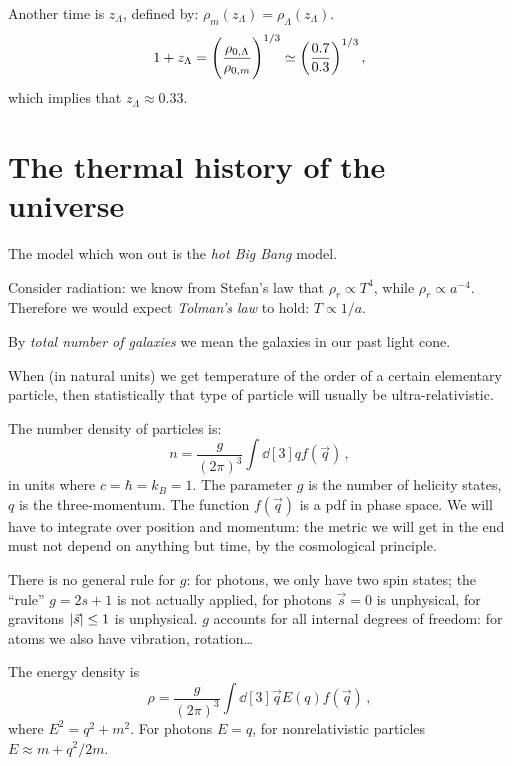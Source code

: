 \documentclass[main.tex]{subfiles}
\begin{document}
Another time is \(z_\Lambda \), defined by: \(\rho _m (z_{\Lambda }) = \rho _\Lambda (z_\Lambda )\). 
%
\begin{equation}
  1+ z_\Lambda = \qty(\frac{\rho_{0, \Lambda }}{\rho_{0,m}})^{1/3} \simeq \qty(\frac{0.7}{0.3})^{1/3}
\,,
\end{equation}
%
which implies that \(z_\Lambda \approx \num{0.33}\).

\chapter{The thermal history of the universe}

The model which won out is the \emph{hot Big Bang} model.

Consider radiation: we know from Stefan's law that \(\rho _r \propto T^{4}\), while \(\rho _r \propto a^{-4}\). Therefore we would expect \emph{Tolman's law} to hold: \(T \propto 1/a\).

By \emph{total number of galaxies} we mean the galaxies in our past light cone.

When (in natural units) we get temperature of the order of a certain elementary particle, then statistically that type of particle will usually be ultra-relativistic.

The number density of particles is: 
%
\begin{equation}
  n = \frac{g}{(2 \pi )^3} \int \dd[3]{q} f(\vec{q})
\,,
\end{equation}
%
in units where \(c= \hbar = k_B = 1\). The parameter \(g\) is the number of helicity states, \(q\) is the three-momentum. The function \(f(\vec{q})\) is a pdf in phase space.
We will have to integrate  over position and momentum: the metric we will get in the end must not depend on anything but time, by the cosmological principle.

There is no general rule for \(g\): for photons, we only have two spin states; the ``rule'' \(g = 2s +1 \) is not actually applied, for photons \(\vec{s} = 0\) is unphysical, for gravitons \(\abs{\vec{s}} \leq 1 \) is unphysical.
\(g\) accounts for all internal degrees of freedom: for atoms we also have vibration, rotation\dots

The energy density is 
%
\begin{equation}
  \rho = \frac{g}{(2 \pi )^3} \int \dd[3]{\vec{q}} E(q) f(\vec{q}) 
\,,
\end{equation}
%
where \(E^2 = q^2 + m^2\). For photons \(E = q\), for nonrelativistic particles \(E \approx m + q^2 / 2m\).
\end{document}
